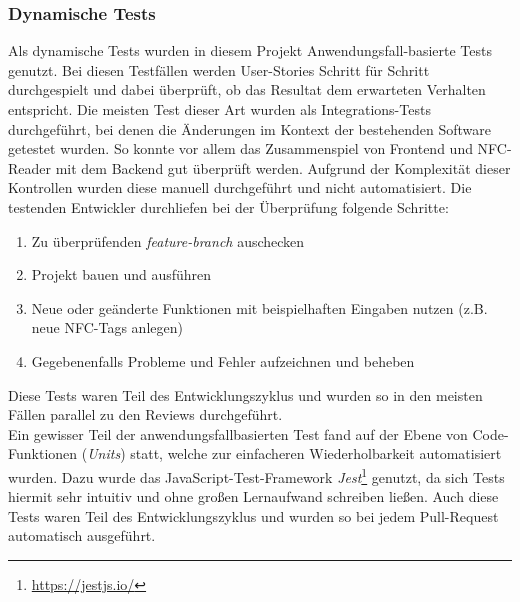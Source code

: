 \documentclass[10pt, a4paper]{article}
\begin{document}
\begin{onehalfspace}
  \subsubsection*{Dynamische Tests}
    Als dynamische Tests wurden in diesem Projekt Anwendungsfall-basierte Tests genutzt.
    Bei diesen Testfällen werden User-Stories Schritt für Schritt \glqq durchgespielt\grqq{} und dabei überprüft, ob das Resultat  dem erwarteten Verhalten entspricht.
    Die meisten Test dieser Art wurden als Integrations-Tests durchgeführt, bei denen die Änderungen im Kontext der bestehenden Software getestet wurden.
    So konnte vor allem das Zusammenspiel von Frontend und NFC-Reader mit dem Backend gut überprüft werden.
    Aufgrund der Komplexität dieser Kontrollen wurden diese manuell durchgeführt und nicht automatisiert.
    Die testenden Entwickler durchliefen bei der Überprüfung folgende Schritte:
    \begin{enumerate}
      \item Zu überprüfenden \textit{feature-branch} auschecken
      \item Projekt bauen und ausführen
      \item Neue oder geänderte Funktionen mit beispielhaften Eingaben nutzen (z.B. neue NFC-Tags anlegen)
      \item Gegebenenfalls Probleme und Fehler aufzeichnen und beheben
    \end{enumerate}
    Diese Tests waren Teil des Entwicklungszyklus und wurden so in den meisten Fällen parallel zu den Reviews durchgeführt.
    \\
    Ein gewisser Teil der anwendungsfallbasierten Test fand auf der Ebene von Code-Funktionen (\textit{Units}) statt, welche zur einfacheren Wiederholbarkeit automatisiert wurden.
    Dazu wurde das JavaScript-Test-Framework \textit{Jest}\footnote{\raggedright\url{https://jestjs.io/}} genutzt, da sich Tests hiermit sehr intuitiv und ohne großen Lernaufwand schreiben ließen.
    Auch diese Tests waren Teil des Entwicklungszyklus und wurden so bei jedem Pull-Request automatisch ausgeführt.



\end{onehalfspace}
\end{document}
